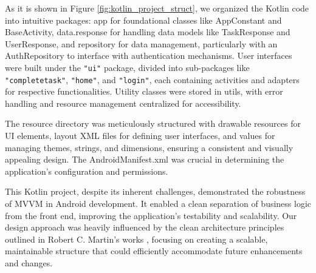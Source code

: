 As it is shown in Figure \ref*{fig:kotlin_project_struct}, we organized the Kotlin code into intuitive packages: app for foundational classes like AppConstant and BaseActivity, data.response for handling data models like TaskResponse and UserResponse, and repository for data management, particularly with an AuthRepository to interface with authentication mechanisms. User interfaces were built under the \verb|"ui"| package, divided into sub-packages like \verb|"completetask"|, \verb|"home"|, and \verb|"login"|, each containing activities and adapters for respective functionalities. Utility classes were stored in utils, with error handling and resource management centralized for accessibility.
\par
The resource directory was meticulously structured with drawable resources for UI elements, layout XML files for defining user interfaces, and values for managing themes, strings, and dimensions, ensuring a consistent and visually appealing design. The AndroidManifest.xml was crucial in determining the application's configuration and permissions.
\par
This Kotlin project, despite its inherent challenges, demonstrated the robustness of MVVM in Android development. It enabled a clean separation of business logic from the front end, improving the application's testability and scalability. Our design approach was heavily influenced by the clean architecture principles outlined in Robert C. Martin's works \cite{martin2009clean}, focusing on creating a scalable, maintainable structure that could efficiently accommodate future enhancements and changes.

